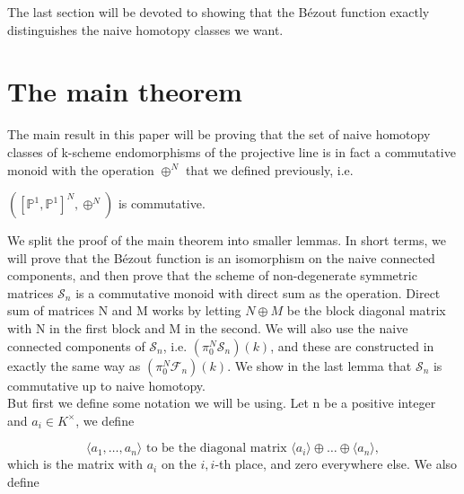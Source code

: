%
The last section will be devoted to showing that the Bézout function exactly distinguishes the naive homotopy classes we want.
%
%
\section{The main theorem}
%
The main result in this paper will be proving that the set of naive homotopy classes of k-scheme endomorphisms of the projective line is in fact a commutative monoid with the operation \(\oplus^N\) that we defined previously, i.e.
%
\begin{theorem}\label{thm:Main-theorem}
\(([\mathbb{P}^1, \mathbb{P}^1]^N,\oplus^N)\) is commutative. 
\end{theorem}
%
We split the proof of the main theorem into smaller lemmas. In short terms, we will prove that the Bézout function is an isomorphism on the naive connected components, and then prove that the scheme of non-degenerate symmetric matrices \(\mathcal{S}_n\) is a commutative monoid with direct sum as the operation. Direct sum of matrices N and M works by letting \(N\oplus M\) be the block diagonal matrix with N in the first block and M in the second. We will also use the naive connected components of \(\mathcal{S}_n\), i.e. \((\pi_0^N\mathcal{S}_n)(k)\), and these are constructed in exactly the same way as \((\pi_0^N\mathcal{F}_n)(k)\). We show in the last lemma that \(\mathcal{S}_n\) is commutative up to naive homotopy.\\
But first we define some notation we will be using. Let n be a positive integer and \(a_i \in K^{\times}\), we define
%
%
%
%
%

\begin{equation*}\label{def:diagonal matrix <a..a> }
%
\langle a_1, \dots, a_n \rangle  \text{ to be the diagonal matrix } \langle a_ i\rangle \oplus \dots \oplus \langle   a_n \rangle  ,
%
\end{equation*}
%
which is the matrix with \(a_i\) on the \(i,i\)-th place, and zero everywhere else. We also define 
%

